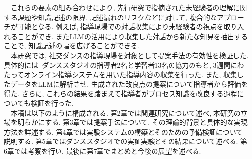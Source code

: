 　これらの要素の組み合わせにより, 先行研究で指摘された未経験者の理解に関する課題や知識記述の限界, 記述漏れのリスクなどに対して, 複合的なアプローチが可能となる. 例えば, 指導現場での対話収集により未経験者の視点を取り入れることができ, またLLMの活用により収集した対話から新たな知見を抽出することで, 知識記述の幅を広げることができる.\\
　本研究では, 社交ダンスの指導現場を対象として提案手法の有効性を検証した. 具体的には, ダンススタジオの指導者2名と学習者13名の協力のもと, 3週間にわたってオンライン指導システムを用いた指導内容の収集を行った. また, 収集したデータをLLMに解析させ, 生成された改良点の提案について指導者から評価を得た. さらに, これらの結果を踏まえて指導者がプロセス知識を改良する過程についても検証を行った.\\
　本稿は以下のように構成される. 第2章では関連研究について述べ, 本研究の立場を明らかにする. 第3章では提案手法について, その理論的背景と具体的な実現方法を詳述する. 第4章では実験システムの構築とそのための予備検証について説明する. 第5章ではダンススタジオでの実証実験とその結果について述べる. 第6章では考察を行い, 最後に第7章でまとめと今後の展望を述べる.\\


